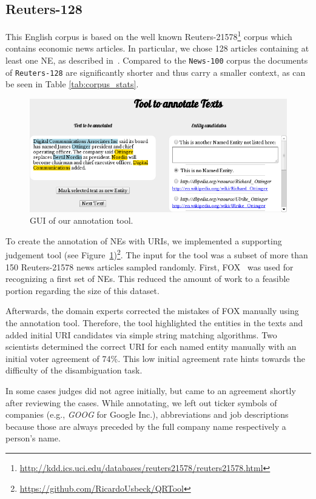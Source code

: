\documentclass[10pt, a4paper]{article}
\begin{document}
\subsection{Reuters-128}

This English corpus is based on the well known Reuters-21578\footnote{\url{http://kdd.ics.uci.edu/databases/reuters21578/reuters21578.html}} corpus which contains economic news articles.
In particular, we chose 128 articles containing at least one NE, as described in~\cite{Usbeck2013}.
Compared to the \texttt{News-100} corpus the documents of \texttt{Reuters-128} are significantly shorter and thus carry a smaller context, as can be seen in Table \ref{tab:corpus_stats}.
\begin{figure}[tb]
\centering
\includegraphics[width=\linewidth]{qrtool.png}
\caption{GUI of our annotation tool.}
\label{fig:qrtool}
\end{figure}

To create the annotation of NEs with URIs, we implemented a supporting judgement tool (see Figure~\ref{fig:qrtool})\footnote{\url{https://github.com/RicardoUsbeck/QRTool}}. The input for the tool was a subset of more than 150 Reuters-21578 news articles sampled randomly.
First, FOX~\cite{fox} was used for recognizing a first set of NEs. 
This reduced the amount of work to a feasible portion regarding the size of this dataset.

Afterwards, the domain experts corrected the  mistakes of FOX manually using the annotation tool.
Therefore, the tool highlighted the entities in the texts and added initial URI candidates via simple string matching algorithms.
Two scientists determined the correct URI for each named entity manually with an initial voter agreement of 74\%.
This low initial agreement rate hints towards the difficulty of the disambiguation task.

In some cases judges did not agree initially, but came to an agreement shortly after reviewing the cases.
While annotating, we left out ticker symbols of companies (e.g., \textit{GOOG} for Google Inc.), abbreviations and job descriptions because those are always preceded by the full company name respectively a person's name.
\end{document}
